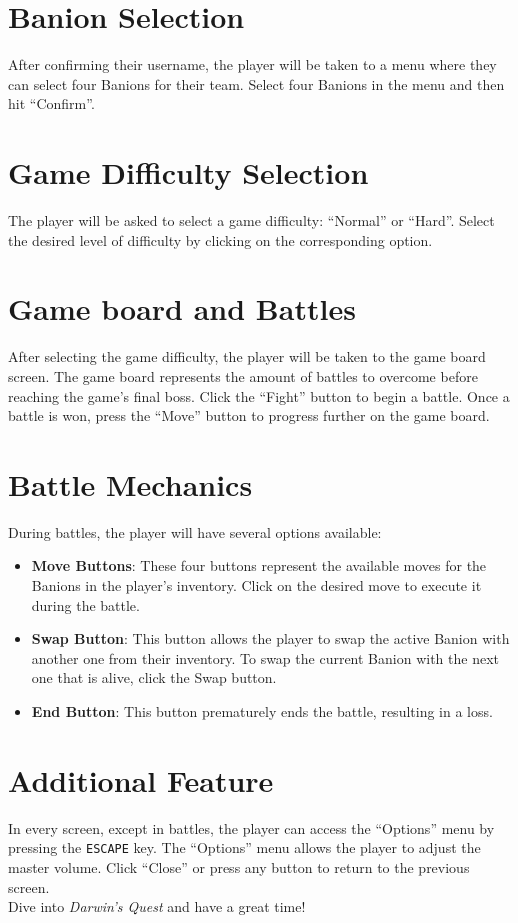 \documentclass[12pt, a4paper]{report}
\theoremstyle{definition}
\begin{document}
\section{Banion Selection}
After confirming their username, the player will be taken to a menu where they can select four Banions for their team.
Select four Banions in the menu and then hit ``Confirm''.

\section{Game Difficulty Selection}
The player will be asked to select a game difficulty: ``Normal'' or ``Hard''. Select the desired level of difficulty by clicking on the corresponding option.

\section{Game board and Battles}
After selecting the game difficulty, the player will be taken to the game board screen. The game board represents the amount of battles to overcome before reaching the game's final boss.
Click the ``Fight'' button to begin a battle. Once a battle is won, press the ``Move'' button to progress further on the game board.

\section{Battle Mechanics}
During battles, the player will have several options available:
\begin{itemize}
  \item \textbf{Move Buttons}: These four buttons represent the available moves for the Banions in the player's inventory. Click on the desired move to execute it during the battle.
  \item \textbf{Swap Button}: This button allows the player to swap the active Banion with another one from their inventory. To swap the current Banion with the next one that is alive, click the Swap button.
  \item \textbf{End Button}: This button prematurely ends the battle, resulting in a loss.
\end{itemize}

\section{Additional Feature}
In every screen, except in battles, the player can access the ``Options'' menu by pressing the \verb|ESCAPE| key.
The ``Options'' menu allows the player to adjust the master volume. Click ``Close'' or press any button to return to the previous screen.\\
Dive into \emph{Darwin's Quest} and have a great time!
\end{document}
